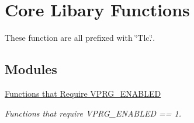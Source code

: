 \hypertarget{group__CoreFunctions}{}\section{Core Libary Functions}
\label{group__CoreFunctions}


These function are all prefixed with \char`\"{}\+Tlc.\char`\"{}.  


\subsection*{Modules}
\begin{DoxyCompactItemize}
\item 
\hyperlink{group__ReqVPRG__ENABLED}{Functions that Require V\+P\+R\+G\+\_\+\+E\+N\+A\+B\+L\+ED}
\begin{DoxyCompactList}\small\item\em Functions that require V\+P\+R\+G\+\_\+\+E\+N\+A\+B\+L\+ED == 1. \end{DoxyCompactList}\end{DoxyCompactItemize}
